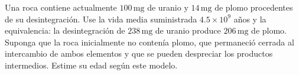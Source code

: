 Una roca contiene actualmente $100\,\mathrm{mg}$ de uranio y $14\,\mathrm{mg}$ de plomo procedentes de su desintegración. Use la vida media suministrada $4.5\times10^9$ años y la equivalencia: la desintegración de $238\,\mathrm{mg}$ de uranio produce $206\,\mathrm{mg}$ de plomo. Suponga que la roca inicialmente no contenía plomo, que permaneció cerrada al intercambio de ambos elementos y que se pueden despreciar los productos intermedios. Estime su edad según este modelo.
